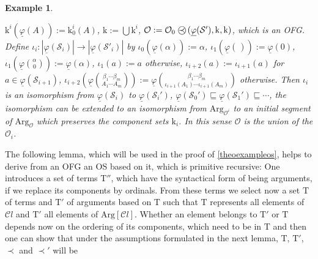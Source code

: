 \documentclass[10pt]{article}
\newtheorem {example}[lemma]{Example}
\def\ar{\rightarrow}
\def \calO{{\mathcal O}}
\def \calS{{\mathcal S}}
\def\Arg{\mathrm{Arg}}
\def\k{\mathrm{k}}
\def\Cl{{\mathcal{C}l}}
\def\phibar{{\underline{\varphi}}}
\def\preccirc{\mathrel{\bigcirc \kern-12pt \prec}} %
\def\T{\mathrm{T}}
\def \segment{\sqsubseteq}
\begin{document}
\begin{example}
{\begin{enumerate}
$\k^i(\phibar(A)):= \k^i_0(A)$,
$\k:= \bigcup \k^i$,
$\calO:= \calO_0 \preccirc (\phibar(\calS'),\k,\k)$, which is an OFG.\\
Define $\iota_i:|\phibar(\calS_i)| \ar |\phibar(\calS'_i)|$ by
$\iota_0(\phibar(\alpha)):= \alpha$,
$\iota_1(\phibar{\binom{}{}}):= \phibar(0)$,
$\iota_1(\phibar{\binom{\alpha}{0}}):= \phibar(\alpha)$,
$\iota_1(a):= a$ otherwise,
$\iota_{i+2}(a):= \iota_{i+1}(a)$ for $a \in \phibar(\calS_{i+1})$,
$\iota_{i+2}(\phibar{\binom{\beta_1 \cdots \beta_m}{A_1 \cdots A_m}}):=
\phibar{\binom{\beta_1 \cdots \beta_m}{\iota_{i+1} (A_1)\cdots\iota_{i+1} (A_m)}}$
otherwise.
Then $\iota_i$ is an isomorphism from $\phibar(\calS_i)$ to 
$\phibar(\calS_i')$, 
$\phibar(\calS_0') \segment \phibar(\calS_1') \segment \cdots$, the
isomorphism can be extended to an 
isomorphism from $\Arg_{\calO^i}$ to an initial segment of
$\Arg_{\calO}$ which preserves the component sets $\k_i$.
In this sense $\calO$ is the union of the $\calO_i$.
\end{enumerate}}
\end{example}
%
The following lemma, which will be used in the proof
of \ref{theoexampleos}, helps to derive from an OFG an OS based on 
it, which is primitive recursive: One introduces a set of terms $\T''$,
which have the syntactical form of being arguments, if we replace
its components by ordinals. From these terms we select now a set
$\T$ of terms and $\T'$ of arguments based on $\T$ such that
$\T$ represents all elements of $\Cl$ and $\T'$ all elements
of $\Arg[\Cl]$. Whether an element belongs to $\T'$ or
$\T$ depends now on the ordering of its components, which
need to be in $\T$ and then one can show that under the assumptions formulated
in the next lemma, $\T$, $\T'$, $\prec$ and $\prec'$  will be 
\end{document}
